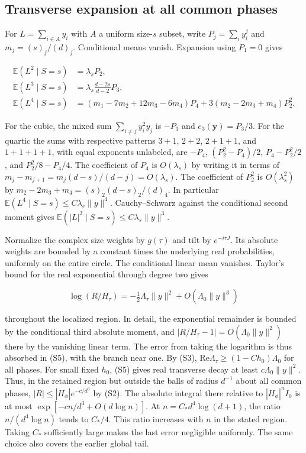 \subsection{Transverse expansion at all common phases}

For $L=\sum_{i\in A}y_i$ with $A$ a uniform size-$s$ subset, write $P_j=\sum_i y_i^j$ and $m_j=(s)_j/(d)_j$. Conditional means vanish. Expansion using $P_1=0$ gives

\begin{equation*}
\begin{aligned}
\mathbb E(L^2\mid S=s)&=\lambda_s P_2,\\
\mathbb E(L^3\mid S=s)&=\lambda_s\frac{d-2s}{d-2}P_3,\\
\mathbb E(L^4\mid S=s)&=(m_1-7m_2+12m_3-6m_4)P_4
                  +3(m_2-2m_3+m_4)P_2^2.
\end{aligned}
\end{equation*}

For the cubic, the mixed sum $\sum_{i\ne j}y_i^2y_j$ is $-P_3$ and $e_3(\mathbf y)=P_3/3$. For the quartic the sums with respective patterns $3+1$, $2+2$, $2+1+1$, and $1+1+1+1$, with equal exponents unlabeled, are $-P_4$, $(P_2^2-P_4)/2$, $P_4-P_2^2/2$, and $P_2^2/8-P_4/4$. The coefficient of $P_4$ is $O(\lambda_s)$ by writing it in terms of $m_j-m_{j+1}=m_j(d-s)/(d-j)=O(\lambda_s)$. The coefficient of $P_2^2$ is $O(\lambda_s^2)$ by $m_2-2m_3+m_4=(s)_2(d-s)_2/(d)_4$. In particular $\mathbb E(L^4\mid S=s)\le C\lambda_s\|y\|^4$. Cauchy--Schwarz against the conditional second moment gives $\mathbb E(|L|^3\mid S=s)\le C\lambda_s\|y\|^3$.

Normalize the complex size weights by $g(\tau)$ and tilt by $e^{-i\tau J}$. Its absolute weights are bounded by a constant times the underlying real probabilities, uniformly on the entire circle. The conditional linear mean vanishes. Taylor's bound for the real exponential through degree two gives

\begin{equation}
\log(R/H_\tau)=-\tfrac12\Lambda_\tau\|y\|^2+O(\Lambda_0\|y\|^3)
\tag{S5}
\end{equation}

throughout the localized region. In detail, the exponential remainder is bounded by the conditional third absolute moment, and $|R/H_\tau-1|=O(\Lambda_0\|y\|^2)$ there by the vanishing linear term. The error from taking the logarithm is thus absorbed in (S5), with the branch near one. By (S3), $\mathrm{Re}\Lambda_\tau\ge(1-Ch_0)\Lambda_0$ for all phases. For small fixed $h_0$, (S5) gives real transverse decay at least $c\Lambda_0\|y\|^2$. Thus, in the retained region but outside the balls of radius $d^{-1}$ about all common phases, $|R|\le|H_\phi| e^{-c/d^3}$ by (S2). The absolute integral there relative to $|H_\phi|^n I_0$ is at most $\exp[-cn/d^3+O(d\log n)]$. At $n=C_* d^4\log(d+1)$, the ratio $n/(d^4\log n)$ tends to $C_*/4$. This ratio increases with $n$ in the stated region. Taking $C_*$ sufficiently large makes the last error negligible uniformly. The same choice also covers the earlier global tail.

